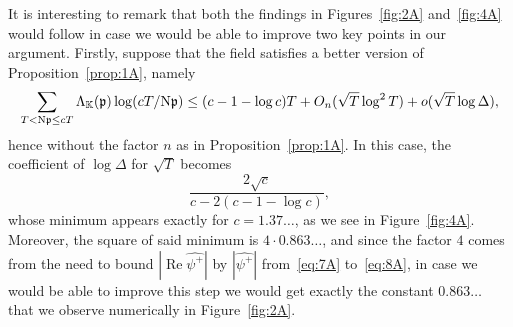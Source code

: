 \documentclass[a4paper,11pt]{amsart}
\newcommand{\field}[1]{\mathbb{{#1}}}
\newcommand{\ideal}[1]{\mathfrak{{#1}}}
\newcommand{\K}{\field{{K}}}
\newcommand{\p}{\ideal{p}}
\newcommand{\Norm}{\textrm{\upshape N}}
\DeclareMathOperator{\Ree}{Re}
\theoremstyle{remark}
\begin{document}
It is interesting to remark that both the findings in Figures~\ref{fig:2A} and~\ref{fig:4A} would follow
in case we would be able to improve two key points in our argument. Firstly, suppose that the field
satisfies a better version of Proposition~\ref{prop:1A}, namely
\[
\sum_{\substack{T< \Norm\p \leq cT}} \Lambda_{\K}(\p)\log(cT/\Norm\p)
\leq (c-1-\log c)T + O_n(\sqrt{T}\log^2T) + o(\sqrt{T}\log\Delta),
\]
hence without the factor $n$ as in Proposition~\ref{prop:1A}. In this case, the coefficient of
$\log\Delta$ for $\sqrt{T}$ becomes
\[
\frac{2\sqrt{c}}{c - 2(c-1-\log c)},
\]
whose minimum appears exactly for $c=1.37\ldots$, as we see in Figure~\ref{fig:4A}.
%
%
Moreover, the square of said minimum is $4\cdot 0.863\ldots$,
%
%
and since the factor $4$ comes from the need to bound $|\Ree\widehat{\psi^+}|$ by $|\widehat{\psi^+}|$
from~\eqref{eq:7A} to~\eqref{eq:8A}, in case we would be able to improve this step we would get exactly
the constant $0.863\ldots$ that we observe numerically in Figure~\ref{fig:2A}. %

%
%
\end{document}
